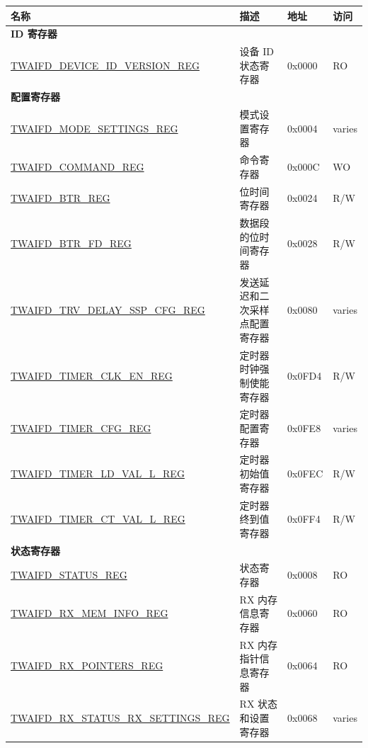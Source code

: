 \begin{longtable}{ | p{6cm} | p{7.2cm} | p{1.3cm} | p{1.5cm} | }
\hline\rowcolor{lightgray}
\textbf{名称} & \textbf{描述} &  \textbf{地址} & \textbf{访问} \\ \hline
\endhead
\multicolumn{4}{|l|}{\textbf{ID 寄存器}} \\ \hline
\hyperref[regdesc:TWAIFDDEVICEIDVERSIONREG]{TWAIFD\_DEVICE\_ID\_VERSION\_REG} & 设备 ID 状态寄存器 & 0x0000 & RO \\ \hline
\multicolumn{4}{|l|}{\textbf{配置寄存器}} \\ \hline
\hyperref[regdesc:TWAIFDMODESETTINGSREG]{TWAIFD\_MODE\_SETTINGS\_REG} & 模式设置寄存器 & 0x0004 & varies \\ \hline
\hyperref[regdesc:TWAIFDCOMMANDREG]{TWAIFD\_COMMAND\_REG} & 命令寄存器 & 0x000C & WO \\ \hline
\hyperref[regdesc:TWAIFDBTRREG]{TWAIFD\_BTR\_REG} & 位时间寄存器  & 0x0024 & R/W \\ \hline
\hyperref[regdesc:TWAIFDBTRFDREG]{TWAIFD\_BTR\_FD\_REG} & 数据段的位时间寄存器  & 0x0028 & R/W \\ \hline
\hyperref[regdesc:TWAIFDTRVDELAYSSPCFGREG]{TWAIFD\_TRV\_DELAY\_SSP\_CFG\_REG} & 发送延迟和二次采样点配置寄存器 & 0x0080 & varies \\ \hline
\hyperref[regdesc:TWAIFDTIMERCLKENREG]{TWAIFD\_TIMER\_CLK\_EN\_REG} & 定时器时钟强制使能寄存器 & 0x0FD4 & R/W \\ \hline
\hyperref[regdesc:TWAIFDTIMERCFGREG]{TWAIFD\_TIMER\_CFG\_REG} & 定时器配置寄存器 & 0x0FE8 & varies \\ \hline
\hyperref[regdesc:TWAIFDTIMERLDVALLREG]{TWAIFD\_TIMER\_LD\_VAL\_L\_REG} & 定时器初始值寄存器  & 0x0FEC & R/W \\ \hline
\hyperref[regdesc:TWAIFDTIMERCTVALLREG]{TWAIFD\_TIMER\_CT\_VAL\_L\_REG} & 定时器终到值寄存器  & 0x0FF4 & R/W \\ \hline
\multicolumn{4}{|l|}{\textbf{状态寄存器}} \\ \hline
\hyperref[regdesc:TWAIFDSTATUSREG]{TWAIFD\_STATUS\_REG} & 状态寄存器 & 0x0008 & RO \\ \hline
\hyperref[regdesc:TWAIFDRXMEMINFOREG]{TWAIFD\_RX\_MEM\_INFO\_REG} & RX 内存信息寄存器 & 0x0060 & RO \\ \hline
\hyperref[regdesc:TWAIFDRXPOINTERSREG]{TWAIFD\_RX\_POINTERS\_REG} & RX 内存指针信息寄存器 & 0x0064 & RO \\ \hline
\hyperref[regdesc:TWAIFDRXSTATUSRXSETTINGSREG]{TWAIFD\_RX\_STATUS\_RX\_SETTINGS\newline\_REG} & RX 状态和设置寄存器 & 0x0068 & varies \\ \hline

\end{longtable}
